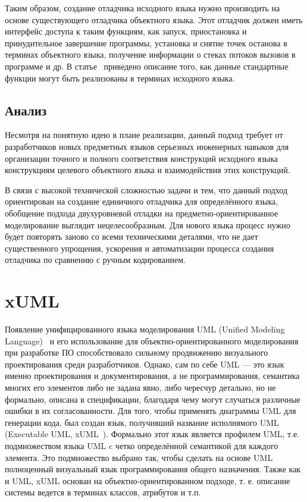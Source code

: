 \documentclass[a5paper]{article}
\begin{document}
Таким образом, создание отладчика исходного языка нужно производить на основе существующего отладчика объектного языка. Этот отладчик должен иметь интерфейс доступа к таким функциям, как запуск, приостановка и принудительное завершение программы, установка и снятие точек останова в терминах объектного языка, получение информации о стеках потоков вызовов в программе и др. В статье~\cite{kartashev} приведено описание того, как данные стандартные функции могут быть реализованы в терминах исходного языка.

\subsection{Анализ}

Несмотря на понятную идею в плане реализации, данный подход требует от разработчиков новых предметных языков серьезных инженерных навыков для организации точного и полного соответствия конструкций исходного языка конструкциям целевого объектного языка и взаимодействия этих конструкций. 

В связи с высокой технической сложностью задачи и тем, что данный подход ориентирован на создание единичного отладчика для определённого языка, обобщение подхода двухуровневой отладки на предметно-ориентированное моделирование выглядит нецелесообразным. Для нового языка процесс нужно будет повторять заново со всеми техническими деталями, что не дает существенного упрощения, ускорения и автоматизации процесса создания отладчика по сравнению с ручным кодированием.

\section{xUML}

Появление унифицированного языка моделирования UML (Unified Modeling Language)~\cite{uml} и его использование для объектно-ориентированного моделирования при разработке ПО способствовало сильному продвижению визуального проектирования среди разработчиков. Однако, сам по себе UML — это язык именно проектирования и документирования, а не программирования, семантика многих его элементов либо не задана явно, либо чересчур детально, но не формально, описана в спецификации, благодаря чему могут случаться различные ошибки в их согласованности. Для того, чтобы применять диаграммы UML для генерации кода, был создан язык, получивший название исполнямого UML (Executable UML, xUML~\cite{xuml1, xuml2, xuml3}). Формально этот язык является профилем UML, т.е. подмножеством языка UML c четко определённой семантикой для каждого элемента. Это подмножество выбрано так, чтобы сделать на основе UML полноценный визуальный язык программирования общего назначения. Также как и UML, xUML основан на объектно-ориентированном подходе, т.
е. описание системы ведется в терминах классов, атрибутов и т.п.
\end{document}
